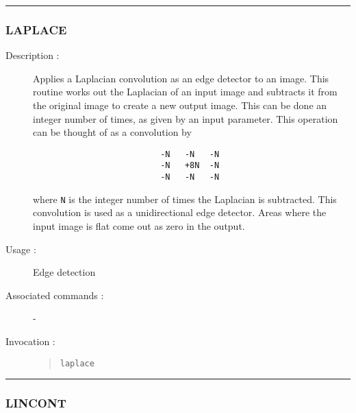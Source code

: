 \hrule 
\subsubsection*{\label{LAPLACE}LAPLACE}

\begin{description}

\item[Description :] Applies a Laplacian convolution as an edge
detector to an image. This routine works out the Laplacian of an input
image and subtracts it from the original image to create a new output
image. This can be done an integer number of times, as given by an
input parameter. This operation can be thought of as a convolution by

\begin{verbatim}
                          -N   -N   -N
                          -N   +8N  -N
                          -N   -N   -N
\end{verbatim}

where {\tt N} is the integer number of times the Laplacian is
subtracted. This convolution is used as a unidirectional edge detector.
Areas where the input image is flat come out as zero in the output.

\item[Usage :] Edge detection
\item[Associated commands :] -
\item[Invocation :]

\begin{quote}{\tt  laplace }\end{quote}

\end{description}

\hrule 
\subsubsection*{\label{LINCONT}LINCONT}

